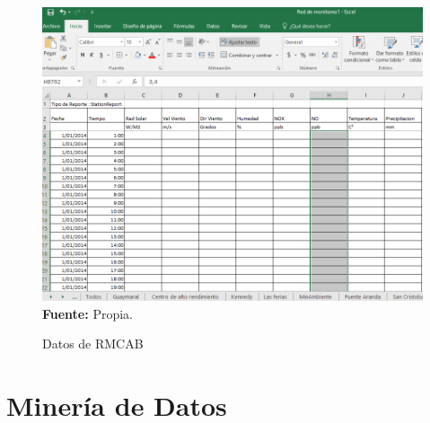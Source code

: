 \documentclass[a4paper,openright,12pt]{book}
\theoremstyle{definition}
\theoremstyle{remark}
\begin{document}
\begin{figure}[ht]
\centering
\caption{Datos de RMCAB} 
\includegraphics[scale=0.6]{SeleccionDato}
\label{fig:Rips6}
\\ \textbf{Fuente:} Propia.
\end{figure}

\section{Minería de Datos}
\end{document}
